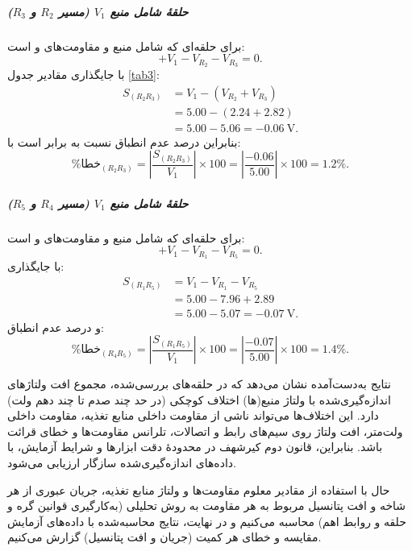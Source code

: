 \documentclass[a4paper, 11pt]{article}
\begin{document}
\subparagraph{حلقهٔ شامل منبع \texorpdfstring{$V_1$}{V1} (مسیر \texorpdfstring{$R_2$}{R2} و \texorpdfstring{$R_3$}{R3})}
برای حلقه‌ای که شامل منبع  و مقاومت‌های  و  است:
\begin{equation}
+V_1 - V_{R_2} - V_{R_3} = 0.
\end{equation}
با جایگذاری مقادیر جدول \ref{tab3}:
\begin{align}
S_{(R_2R_3)} &= V_1 - (V_{R_2}+V_{R_3}) \nonumber\\
&= 5.00 - (2.24 + 2.82) \nonumber\\
&= 5.00 - 5.06 = -0.06~\mathrm{V}.
\end{align}
بنابراین درصد عدم انطباق نسبت به  برابر است با:
\begin{equation}
\%\text{خطا}_{(R_2R_3)}=
\left|\frac{S_{(R_2R_3)}}{V_1}\right|\times 100
=
\left|\frac{-0.06}{5.00}\right|\times 100
= 1.2\%.
\end{equation}

\subparagraph{حلقهٔ شامل منبع \texorpdfstring{$V_1$}{V1} (مسیر \texorpdfstring{$R_4$}{R4} و \texorpdfstring{$R_5$}{R5})}
برای حلقه‌ای که شامل منبع  و مقاومت‌های  و  است:
\begin{equation}
+V_1 - V_{R_1} - V_{R_5} = 0.
\end{equation}
با جایگذاری:
\begin{align}
S_{(R_1R_5)} &= V_1 - V_{R_1} - V_{R_5} \nonumber\\
&= 5.00 - 7.96 + 2.89 \nonumber\\
&= 5.00 - 5.07 = -0.07~\mathrm{V}.
\end{align}
و درصد عدم انطباق:
\begin{equation}
\%\text{خطا}_{(R_4R_5)}=
\left|\frac{S_{(R_1R_5)}}{V_1}\right|\times 100
=
\left|\frac{-0.07}{5.00}\right|\times 100
= 1.4\%.
\end{equation}

نتایج به‌دست‌آمده نشان می‌دهد که در حلقه‌های بررسی‌شده، مجموع افت ولتاژهای اندازه‌گیری‌شده با ولتاژ منبع(ها) اختلاف کوچکی (در حد چند صدم تا چند دهم ولت) دارد. این اختلاف‌ها می‌تواند ناشی از مقاومت داخلی منابع تغذیه، مقاومت داخلی ولت‌متر، افت ولتاژ روی سیم‌های رابط و اتصالات، تلرانس مقاومت‌ها و خطای قرائت باشد. بنابراین، قانون دوم کیرشهف در محدودهٔ دقت ابزارها و شرایط آزمایش، با داده‌های اندازه‌گیری‌شده سازگار ارزیابی می‌شود.

 حال با استفاده از مقادیر معلوم مقاومت‌ها و ولتاژ منابع تغذیه، جریان عبوری از هر شاخه و افت پتانسیل مربوط به هر مقاومت به روش تحلیلی (به‌کارگیری قوانین گره و حلقه و روابط اهم) محاسبه می‌کنیم و در نهایت، نتایج محاسبه‌شده با داده‌های آزمایش مقایسه و خطای هر کمیت (جریان و افت پتانسیل) گزارش می‌کنیم.
\end{document}
